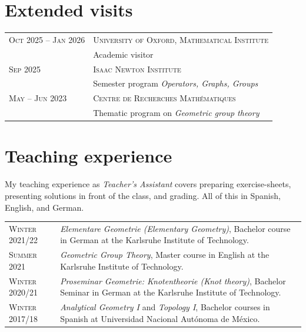 \documentclass[a4paper,10pt]{article} %
\begin{document}
\section{Extended visits}

\begin{longtable}{>{\raggedleft\arraybackslash}p{4cm}p{10cm}}

\textsc{Oct 2025 -- Jan 2026} &\textsc{University of Oxford, Mathematical Institute} \\ & Academic visitor\vspace{0.5em}\\

\textsc{Sep 2025} &\textsc{Isaac Newton Institute} \\ &Semester program \emph{Operators, Graphs, Groups} \vspace{0.5em}\\

\textsc{May -- Jun 2023} &\textsc{Centre de Recherches Mathématiques} \\ & Thematic program on \emph{Geometric group theory}

\end{longtable}


\section{Teaching experience}

\begin{minipage}{15cm}
My teaching experience as \emph{Teacher's Assistant} covers preparing exercise-sheets, presenting solutions in front of the class, and grading. All of this in Spanish, English, and German.
\end{minipage}

\begin{longtable}{>{\raggedleft\arraybackslash}p{4.2cm}p{10cm}}

    \textsc{Winter 2021/22} & \emph{Elementare Geometrie (Elementary Geometry)}, Bachelor course in German at the Karlsruhe Institute of Technology. \\

    \textsc{Summer 2021} & \emph{Geometric Group Theory}, Master course in English at the Karlsruhe Institute of Technology.\\

    \textsc{Winter 2020/21} & \emph{Proseminar Geometrie: Knotentheorie (Knot theory)}, Bachelor Seminar in German at the Karlsruhe Institute of Technology.\\

    \textsc{Winter 2017/18} & \emph{Analytical Geometry I} and \emph{Topology I}, Bachelor courses in Spanish at Universidad Nacional Autónoma de México.\\
    
\end{longtable}
\end{document}
